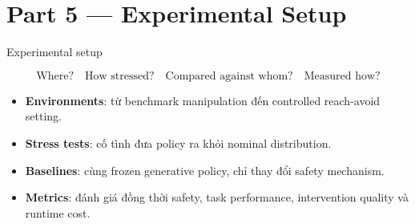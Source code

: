 \documentclass[aspectratio=169]{beamer}
\begin{document}
\section{Part 5 --- Experimental Setup}

\begin{frame}[t,shrink=8]{Experimental setup}

\begin{center}

\Large
\[
\boxed{
\text{Where?}
\quad
\boxed{\text{How stressed?}}
\quad
\boxed{\text{Compared against whom?}}
\quad
\boxed{\text{Measured how?}}
}
\]

\end{center}

\vspace{8pt}

\begin{itemize}
    \item \textbf{Environments}: từ benchmark manipulation đến controlled
    reach-avoid setting.

    \item \textbf{Stress tests}: cố tình đưa policy ra khỏi nominal
    distribution.

    \item \textbf{Baselines}: cùng frozen generative policy, chỉ thay đổi
    safety mechanism.

    \item \textbf{Metrics}: đánh giá đồng thời safety, task performance,
    intervention quality và runtime cost.
\end{itemize}

\end{frame}
\end{document}
